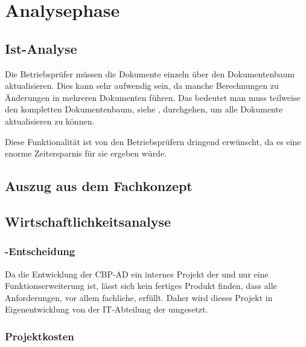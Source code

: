 
\clearpage
\section{Analysephase} 
\label{sec:Analysephase}


\subsection{Ist-Analyse} 
\label{sec:IstAnalyse}

Die Betriebsprüfer müssen die Dokumente einzeln über den Dokumentenbaum aktualisieren. Dies kann sehr aufwendig sein, da manche Berechnungen zu Änderungen in mehreren Dokumenten führen. Das bedeutet man muss teilweise den kompletten Dokumentenbaum, siehe , durchgehen, um alle Dokumente aktualisieren zu können.


Diese Funktionalität ist von den Betriebsprüfern dringend erwünscht, da es eine enorme Zeitersparnis für sie ergeben würde.

\subsection{Auszug aus dem Fachkonzept}
\label{sec:AuszugFachkonzept}


\subsection{Wirtschaftlichkeitsanalyse}
\label{sec:Wirtschaftlichkeitsanalyse}

\subsubsection{-Entscheidung}
\label{sec:MakeOrBuyEntscheidung}

Da die Entwicklung der \acs{CBP-AD} ein internes Projekt der \DRV und nur eine Funktionserweiterung ist, lässt sich kein fertiges Produkt finden, dass alle Anforderungen, vor allem fachliche, erfüllt. Daher wird dieses Projekt in Eigenentwicklung von der IT-Abteilung der \DRV umgesetzt.

\subsubsection{Projektkosten}
\label{sec:Projektkosten}

